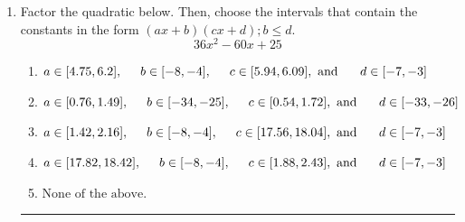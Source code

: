 \documentclass[14pt]{extbook}
\newcommand{\litem}[1]{\item#1\hspace*{-1cm}\rule{\textwidth}{0.4pt}}
\begin{document}
\begin{enumerate}
{\begin{enumerate}[label=\Alph*.]
\end{enumerate} }
\litem{
Factor the quadratic below. Then, choose the intervals that contain the constants in the form $(ax+b)(cx+d); b \leq d.$\[ 36x^{2} -60 x + 25 \]\begin{enumerate}[label=\Alph*.]
\item \( a \in [4.75, 6.2], \hspace*{5mm} b \in [-8, -4], \hspace*{5mm} c \in [5.94, 6.09], \text{ and } \hspace*{5mm} d \in [-7, -3] \)
\item \( a \in [0.76, 1.49], \hspace*{5mm} b \in [-34, -25], \hspace*{5mm} c \in [0.54, 1.72], \text{ and } \hspace*{5mm} d \in [-33, -26] \)
\item \( a \in [1.42, 2.16], \hspace*{5mm} b \in [-8, -4], \hspace*{5mm} c \in [17.56, 18.04], \text{ and } \hspace*{5mm} d \in [-7, -3] \)
\item \( a \in [17.82, 18.42], \hspace*{5mm} b \in [-8, -4], \hspace*{5mm} c \in [1.88, 2.43], \text{ and } \hspace*{5mm} d \in [-7, -3] \)
\item \( \text{None of the above.} \)


\end{enumerate}}
\end{enumerate}
\end{document}

